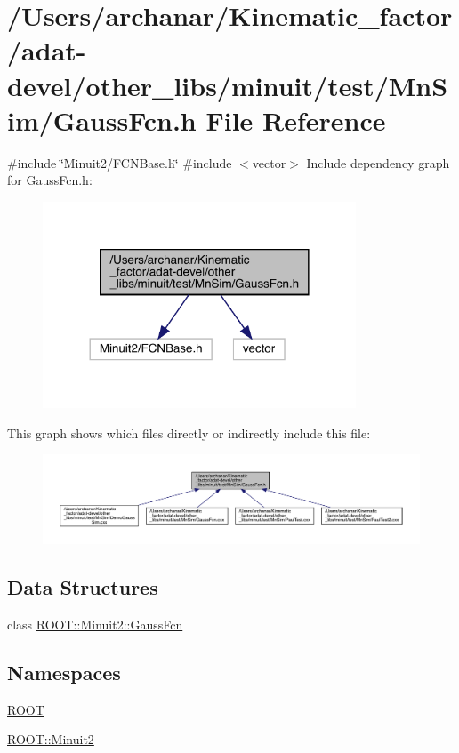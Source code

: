 \hypertarget{adat-devel_2other__libs_2minuit_2test_2MnSim_2GaussFcn_8h}{}\section{/\+Users/archanar/\+Kinematic\+\_\+factor/adat-\/devel/other\+\_\+libs/minuit/test/\+Mn\+Sim/\+Gauss\+Fcn.h File Reference}
\label{adat-devel_2other__libs_2minuit_2test_2MnSim_2GaussFcn_8h}
{\ttfamily \#include \char`\"{}Minuit2/\+F\+C\+N\+Base.\+h\char`\"{}}\newline
{\ttfamily \#include $<$vector$>$}\newline
Include dependency graph for Gauss\+Fcn.\+h\+:
\nopagebreak
\begin{figure}[H]
\begin{center}
\leavevmode
\includegraphics[width=264pt]{d7/d6d/adat-devel_2other__libs_2minuit_2test_2MnSim_2GaussFcn_8h__incl}
\end{center}
\end{figure}
This graph shows which files directly or indirectly include this file\+:
\nopagebreak
\begin{figure}[H]
\begin{center}
\leavevmode
\includegraphics[width=350pt]{df/d0f/adat-devel_2other__libs_2minuit_2test_2MnSim_2GaussFcn_8h__dep__incl}
\end{center}
\end{figure}
\subsection*{Data Structures}
\begin{DoxyCompactItemize}
\item 
class \mbox{\hyperlink{classROOT_1_1Minuit2_1_1GaussFcn}{R\+O\+O\+T\+::\+Minuit2\+::\+Gauss\+Fcn}}
\end{DoxyCompactItemize}
\subsection*{Namespaces}
\begin{DoxyCompactItemize}
\item 
 \mbox{\hyperlink{namespaceROOT}{R\+O\+OT}}
\item 
 \mbox{\hyperlink{namespaceROOT_1_1Minuit2}{R\+O\+O\+T\+::\+Minuit2}}
\end{DoxyCompactItemize}
